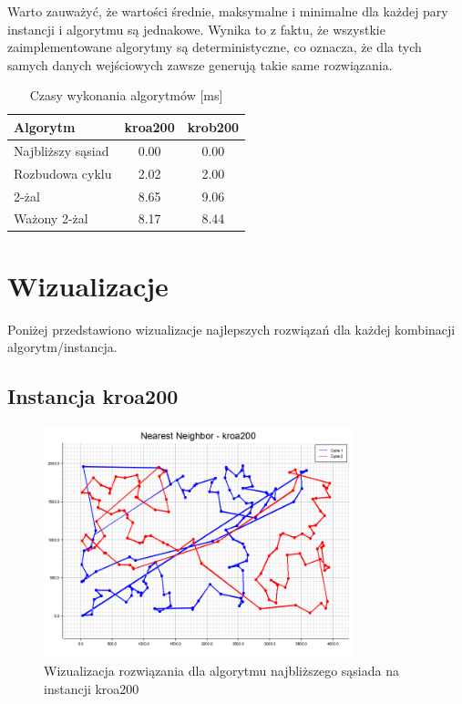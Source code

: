 \documentclass[12pt,a4paper]{article}
\begin{document}
Warto zauważyć, że wartości średnie, maksymalne i minimalne dla każdej pary instancji i algorytmu są jednakowe. Wynika to z faktu, że wszystkie zaimplementowane algorytmy są deterministyczne, co oznacza, że dla tych samych danych wejściowych zawsze generują takie same rozwiązania.

\begin{table}[H]
\centering
\caption{Czasy wykonania algorytmów [ms]}
\begin{tabular}{lcc}
\toprule
\textbf{Algorytm} & \textbf{kroa200} & \textbf{krob200} \\
\midrule
Najbliższy sąsiad & 0.00 & 0.00 \\
Rozbudowa cyklu & 2.02 & 2.00 \\
2-żal & 8.65 & 9.06 \\
Ważony 2-żal & 8.17 & 8.44 \\
\bottomrule
\end{tabular}
\end{table}

\section{Wizualizacje}
Poniżej przedstawiono wizualizacje najlepszych rozwiązań dla każdej kombinacji algorytm/instancja.

\subsection{Instancja kroa200}

\begin{figure}[H]
\centering
\includegraphics[width=0.8\textwidth]{figures/kroa200_Nearest_Neighbor.png}
\caption{Wizualizacja rozwiązania dla algorytmu najbliższego sąsiada na instancji kroa200}
\end{figure}
\end{document}
